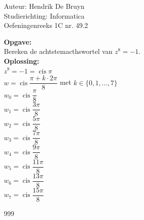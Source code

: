\documentclass[a4paper]{article}
\newcommand{\cis}{\operatorname{cis}}
\begin{document}
  
\noindent \large Auteur: Hendrik De Bruyn \\
\noindent \large Studierichting: Informatica\\
\noindent \large Oefeningenreeks 1C nr. 49.2\\

\medskip

\normalsize

\textbf{Opgave:} \\

Bereken de achtstemacthswortel van $z^8 = -1$. \\

\textbf{Oplossing:} \\

$z^8 = -1 = \cis \pi$ \\

$w = \cis \dfrac{\pi + k\cdot2\pi}{8}$ met $k \in \{0, 1, ..., 7\}$ \\

$w_0 = \cis \dfrac{\pi}{8}$ \\

$w_1 = \cis \dfrac{3\pi}{8}$ \\

$w_2 = \cis \dfrac{5\pi}{8}$ \\

$w_3 = \cis \dfrac{7\pi}{8}$ \\

$w_4 = \cis \dfrac{9\pi}{8}$ \\

$w_5 = \cis \dfrac{11\pi}{8}$ \\

$w_6 = \cis \dfrac{13\pi}{8}$ \\

$w_7 = \cis \dfrac{15\pi}{8}$ \\

\begin{thebibliography}{999}
\end{thebibliography}
\end{document}
